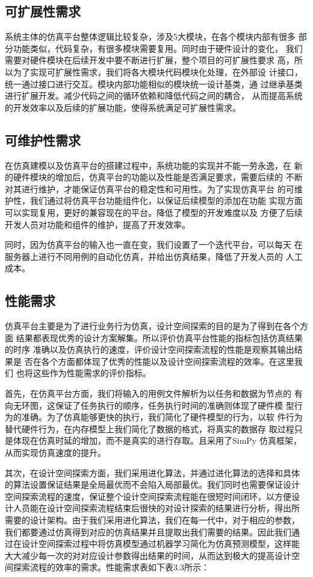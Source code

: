 \subsection{可扩展性需求}
系统主体的仿真平台整体逻辑比较复杂，涉及5大模块，在各个模块内部有很多
部分功能类似，代码复杂，有很多模块需要复用。同时由于硬件设计的变化，
我们需要对硬件模块在后续开发中要不断进行扩展，整个项目的可扩展性要求
高，所以为了实现可扩展性需求，我们将各大模块代码模块化处理，在外部设
计接口，统一通过接口进行交互。模块内部功能相似的模块统一设计基类，通
过继承基类进行扩展开发。减少代码之间的循环依赖和降低代码之间的耦合，
从而提高系统的开发效率以及后续的扩展功能，使得系统满足可扩展性需求。

\subsection{可维护性需求}
在仿真建模以及仿真平台的搭建过程中，系统功能的实现并不能一劳永逸，在
新的硬件模块的增加后，仿真平台的功能以及性能是否满足要求，需要后续的
不断对其进行维护，才能保证仿真平台的稳定性和可用性。为了实现仿真平台
的可维护性，我们通过将仿真平台功能组件化，以保证后续模型的添加在功能
实现方面可以实现复用，更好的兼容现在的平台。降低了模型的开发难度以及
方便了后续开发人员对功能和组件的维护，提高了开发效率。

同时，因为仿真平台的输入也一直在变，我们设置了一个迭代平台，可以每天
在服务器上进行不同用例的自动化仿真，并给出仿真结果，降低了开发人员的
人工成本。

\subsection{性能需求}
仿真平台主要是为了进行业务行为仿真，设计空间探索的目的是为了得到在各个方面
结果都表现优秀的设计方案解集。所以评价仿真平台性能的指标包括仿真结果的时序
准确以及仿真执行的速度，评价设计空间探索流程的性能是观察其输出结果是
否在各个方面都体现了优秀的性能以及设计空间探索流程的效率。在这里我们
也将这些作为性能需求的评价指标。

首先，在仿真平台方面，我们将输入的用例文件解析为以任务和数据为节点的
有向无环图，这保证了任务执行的顺序，任务执行时间的准确则体现了硬件模
型行为的准确。为了仿真能够更快的执行，我们简化了硬件模型的行为，以软
件行为替代硬件行为，在内存模型上我们简化了数据的格式，将真实的数据存
取过程只是体现在仿真时延的增加，而不是真实的进行存取。且采用了SimPy
仿真框架，从而实现仿真速度的提升。

其次，在设计空间探索方面，我们采用进化算法，并通过进化算法的选择和具体
的算法设置保证结果是全局最优而不会陷入局部最优。我们同时也需要保证设计
空间探索流程的速度，保证整个设计空间探索流程能在很短时间闭环，以方便设
计人员能在设计空间探索流程结束后很快的对设计探索的结果进行分析，得出所
需要的设计架构。由于我们采用进化算法，我们在每一代中，对于相应的参数，
我们都要通过仿真得到对应的仿真结果并且提取出我们需要的结果。因此我们通
过在设计空间探索过程中将仿真模型通过机器学习简化为仿真预测模型，这样能
大大减少每一次的对对应设计参数得出结果的时间，从而达到极大的提高设计空
间探索流程的效率的需求。性能需求表如下表3.3所示：

